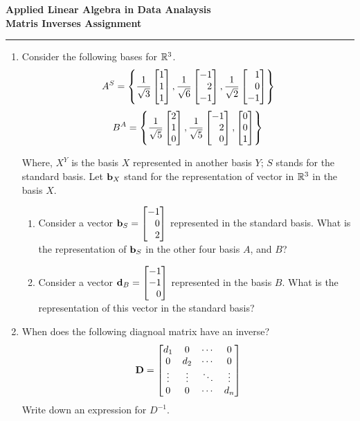 \documentclass[12pt]{article}
\def\mf{\ensuremath\mathbf}
\def\mb{\ensuremath\mathbb}
\def\lc{\ensuremath\left\{}
\def\rc{\ensuremath\right\}}
\def\bmx{\ensuremath\begin{bmatrix*}[r]}
\def\emx{\ensuremath\end{bmatrix*}}
\begin{document}
\begin{center}
\begin{Large}
\textbf{Applied Linear Algebra in Data Analaysis}\\
\vspace{0.1cm}
\textbf{Matris Inverses Assignment}
\end{Large}
\end{center}
\hrule
\vspace{0.2cm}

\begin{enumerate}
    \item Consider the following bases for $\mb{R}^3$.
    \[ A^S = \lc \frac{1}{\sqrt{3}}\bmx1 \\ 1 \\ 1\emx, \frac{1}{\sqrt{6}}\bmx-1 \\ 2 \\ -1\emx, \frac{1}{\sqrt{2}}\bmx1 \\ 0 \\ -1\emx \rc \]
    \[ B^A = \lc \frac{1}{\sqrt{5}}\bmx2 \\ 1 \\ 0\emx, \frac{1}{\sqrt{5}}\bmx-1 \\ 2 \\ 0\emx, \bmx0 \\ 0 \\ 1\emx \rc \]

    Where,  $X^Y$ is the basis $X$ represented in another basis $Y$; $S$ stands for the standard basis. Let $\mf{b}_X$ stand for the representation of vector in $\mb{R}^3$ in the basis $X$. 
    \begin{enumerate}
        \item Consider a vector $\mf{b}_S = \bmx-1\\0\\2\emx$ represented in the standard basis. What is the representation of $\mf{b}_S$ in the other four basis $A$, and $B$?

        \item Consider a vector $\mf{d}_B = \bmx-1\\-1\\0\emx$ represented in the basis $B$. What is the representation of this vector in the standard basis?
    \end{enumerate}


    \item When does the following diagnoal matrix have an inverse?
    \[ \mf{D} = \begin{bmatrix*}
    d_1 & 0 & \cdots & 0\\
    0 & d_2 & \cdots & 0\\
    \vdots & \vdots & \ddots & \vdots\\
    0 & 0 & \cdots & d_n\\\end{bmatrix*} \]
    Write down an expression for $D^{-1}$.
    

\end{enumerate}
\end{document}
